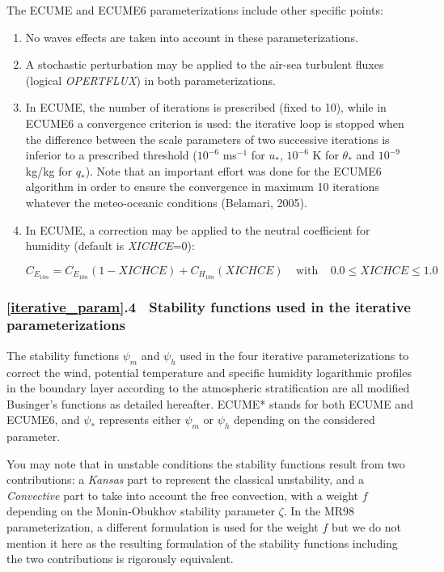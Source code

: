 The ECUME and ECUME6 parameterizations include other specific points:

\begin{enumerate}

	\item No waves effects are taken into account in these parameterizations. 

	\item A stochastic perturbation may be applied to the air-sea turbulent fluxes (logical \textit{OPERTFLUX}) in both
parameterizations.

	\item In ECUME, the number of iterations is prescribed (fixed to 10), while in ECUME6 a convergence criterion is used:
the iterative loop is stopped when the difference between the scale parameters of two successive iterations is 
inferior to a prescribed threshold ($10^{-6}$ ms$^{-1}$ for $u_{*}$, $10^{-6}$ K for $\theta_{*}$ and $10^{-9}$ kg/kg for $q_{*}$).
Note that an important effort was done for the ECUME6 algorithm in order to ensure the convergence in maximum 10 iterations 
whatever the meteo-oceanic conditions (Belamari, 2005). %

	\item In ECUME, a correction may be applied to the neutral coefficient for humidity (default is \textit{XICHCE}=0):

		$C_{E_{10n}}=C_{E_{10n}}(1-\mathit{XICHCE})+C_{H_{10n}}(\mathit{XICHCE})~~~~~\mathrm{with}~~~~~0.0\leq\mathit{XICHCE}\leq1.0$


\end{enumerate}


\subsubsection{\ref{iterative_param}.4 $~$ Stability functions used in the iterative parameterizations}

The stability functions $\psi_{m}$ and $\psi_{h}$ used in the four iterative parameterizations 
to correct the wind, potential temperature and specific humidity logarithmic profiles in the boundary layer 
according to the atmospheric stratification are all modified Businger's %
functions as detailed hereafter. ECUME* stands for both ECUME and ECUME6, and ${\psi}_*$ represents either
$\psi_{m}$ or $\psi_{h}$ depending on the considered parameter.

You may note that in unstable conditions the stability functions result from two contributions: a \textit{Kansas} part
to represent the classical unstability, and a \textit{Convective} part to take into account the free convection,
with a weight $f$ depending on the Monin-Obukhov stability parameter $\zeta$.
In the MR98 parameterization, a different formulation is used for the weight $f$ but we do not
mention it here as the resulting formulation of the stability functions including the two contributions is 
rigorously equivalent.

